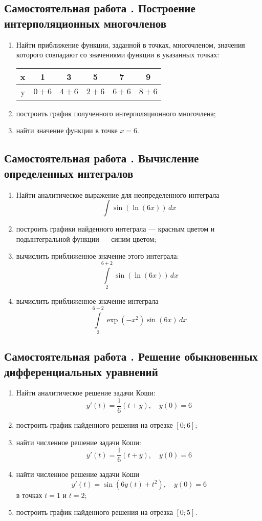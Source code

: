 \documentclass[10pt, a4paper, titlepage]{article}
\begin{document}
\subsection*{Самостоятельная работа . Построение интерполяционных многочленов}
\begin{enumerate}
    \item Найти приближение функции, заданной в точках, многочленом, значения которого совпадают со значениями функции в указанных точках:
    \begin{center}
         \begin{tabular}{|c|c|c|c|c|c|}
             \hline
             x & 1 & 3 & 5 & 7 & 9 \\ \hline
             y & $0+6$ & $4+6$ & $2+6$ & $6+6$ & $8+6$ \\
             \hline
         \end{tabular}
    \end{center}
    \item построить график полученного интерполяционного многочлена;
    \item найти значение функции в точке $x=6$.
\end{enumerate}

\subsection*{Самостоятельная работа . Вычисление определенных интегралов}
\begin{enumerate}
    \item Найти аналитическое выражение для неопределенного интеграла $$\int \sin(\ln(6x))\,dx$$
    \item построить графики найденного интеграла --- красным цветом и подынтегральной функции --- синим цветом;
    \item вычислить приближенное значение этого интеграла: $$\int\limits_2^{6+2} \sin(\ln(6x))\,dx$$
    \item вычислить приближенное значение интеграла $$\int\limits_2^{6+2} \exp(-x^2)\sin(6x)\,dx$$
\end{enumerate}

\subsection*{Самостоятельная работа . Решение обыкновенных дифференциальных уравнений}
\begin{enumerate}
    \item Найти аналитическое решение задачи Коши: $$y'(t)=\frac{1}{6}(t+y), \quad y(0)=6$$
    \item построить график найденного решения на отрезке $[0; 6]$;
    \item найти численное решение задачи Коши: $$y'(t)=\frac{1}{6}(t+y), \quad y(0)=6$$
    \item найти численное решение задачи Коши $$y'(t)=\sin(6y(t)+t^2), \quad y(0)=6$$ в точках $t=1$ и $t=2$;
    \item построить график найденного решения на отрезка $[0; 5]$.
\end{enumerate}
\newpage
\end{document}
